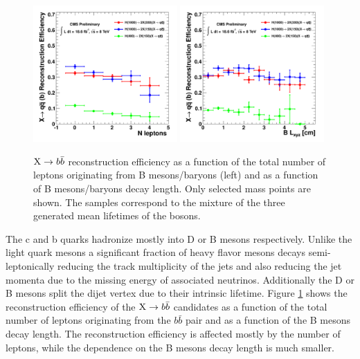 \begin{figure}[htbp]
\centering
\includegraphics[width=0.49\textwidth]{plots/signal/effNLepb.pdf}
\includegraphics[width=0.49\textwidth]{plots/signal/effBlxyzb.pdf}
\caption{$\mathrm{X}\rightarrow b\bar{b}$ reconstruction efficiency as a function of the total number of leptons 
originating from B mesons/baryons (left) and as a function of B mesons/baryons decay length. Only selected 
mass points are shown. The samples correspond to the mixture of the three generated mean 
lifetimes of the \X bosons. \label{fig:effb}}
\end{figure}

The c and b quarks hadronize mostly into D or B mesons respectively.
 Unlike the light quark mesons a significant fraction of heavy flavor
mesons decays semi-leptonically reducing the track multiplicity of the jets and also reducing the jet momenta
 due to the missing energy of associated neutrinos. 
Additionally the D or B mesons split the dijet vertex due to their intrinsic lifetime.
Figure \ref{fig:effb} shows the reconstruction efficiency of the $\mathrm{X}\rightarrow b\bar{b}$ candidates as a function
of the total number of leptons originating from the $b\bar{b}$ pair and as a function of the B mesons decay
length. The reconstruction efficiency is affected mostly by the number of leptons, while the dependence on the
B mesons decay length is much smaller.

